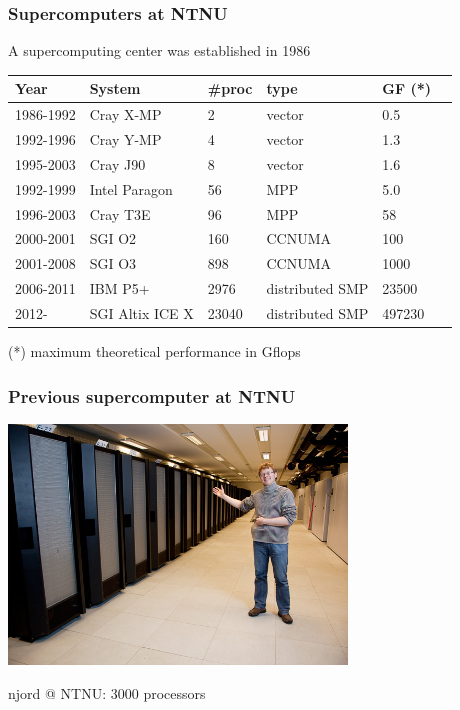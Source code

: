 \documentclass{beamer}
\begin{document}
\begin{frame}\frametitle{Supercomputers at NTNU}
A supercomputing center was established in 1986
\vspace{.2in}

\begin{tabular}{|l|l|l|l|l|l|}
\hline
Year & System & \#proc & type & GF (*)\\
\hline
1986-1992 & Cray X-MP & 2 & vector & 0.5 \\
1992-1996 & Cray Y-MP & 4 & vector & 1.3\\
1995-2003 & Cray J90     & 8 & vector & 1.6 \\
1992-1999 & Intel Paragon & 56 & MPP & 5.0\\
1996-2003 & Cray T3E & 96 & MPP & 58\\
2000-2001 & SGI O2 & 160 & CCNUMA & 100\\
2001-2008 & SGI O3 & 898 & CCNUMA & 1000\\
2006-2011 & IBM P5+ & 2976 & distributed SMP & 23500\\
2012-     & SGI Altix ICE X & 23040 & distributed SMP & 497230 \\
\hline
\end{tabular}

\vspace{.5in}
(*) maximum theoretical performance in Gflops
\end{frame}



\begin{frame}\frametitle{Previous supercomputer at NTNU}
\begin{center}
\includegraphics[width=9cm]{njord_john}
\end{center}
njord @ NTNU: 3000 processors
\end{frame}
\end{document}
